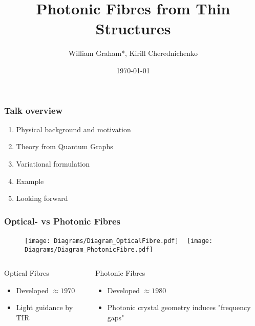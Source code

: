 \documentclass{beamer}
\title{Photonic Fibres from Thin Structures}
\author{William Graham*, Kirill Cherednichenko}
\institute{BUC-XVI, UNAM}
\date{\today}
\begin{document}
 
\frame{\titlepage}
 
\begin{frame}
	\frametitle{Talk overview}
	
	\begin{enumerate}
		\item Physical background and motivation
		\item Theory from Quantum Graphs
		\item Variational formulation
		\item Example
		\item Looking forward
	\end{enumerate}
\end{frame}

\begin{frame}
	\frametitle{Optical- vs Photonic Fibres}
	
	\begin{figure}[t]
		\centering
		\texttt{[image: Diagrams/Diagram\_OpticalFibre.pdf]}
		~
		\texttt{[image: Diagrams/Diagram\_PhotonicFibre.pdf]}
	\end{figure}
	\begin{columns}
		\begin{column}{0.45\textwidth}
			\begin{block}{Optical Fibres}
				\begin{itemize}
					\item Developed $\approx 1970$
					\item Light guidance by TIR
				\end{itemize}
			\end{block}
		\end{column}
		\begin{column}{0.45\textwidth}
			\begin{block}{Photonic Fibres}
				\begin{itemize}
					\item Developed $\approx 1980$
					\item Photonic crystal geometry induces "frequency gaps"
				\end{itemize}
			\end{block}
		\end{column}
	\end{columns}
\end{frame} 
\end{document}
